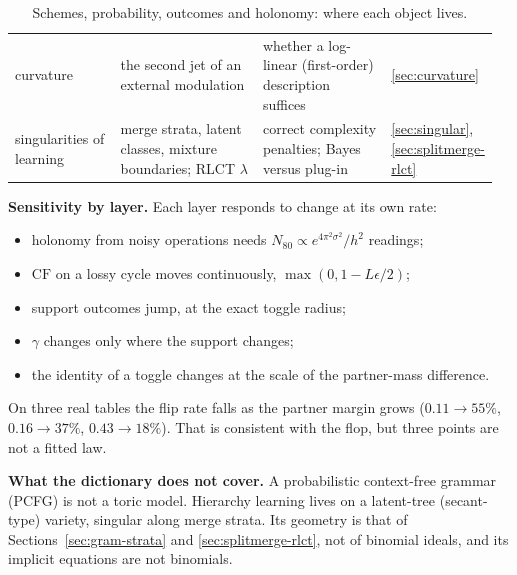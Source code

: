 \documentclass[11pt]{article}
\theoremstyle{definition}
\theoremstyle{remark}
\newcommand{\CF}{\mathrm{CF}}
\begin{document}
\begin{table}[!htbp]
{\begin{tabular}{>{\raggedright\arraybackslash}p{0.22\linewidth}>{\raggedright\arraybackslash}p{0.3\linewidth}>{\raggedright\arraybackslash}p{0.27\linewidth}>{\raggedright\arraybackslash}p{0.17\linewidth}}
curvature & the second jet of an external modulation & whether a log-linear (first-order) description suffices & \ref{sec:curvature}\\
singularities of learning & merge strata, latent classes, mixture boundaries; RLCT $\lambda$ & correct complexity penalties; Bayes versus plug-in & \ref{sec:singular}, \ref{sec:splitmerge-rlct}\\
\bottomrule
\end{tabular}}
\caption{Schemes, probability, outcomes and holonomy: where each object lives.}\label{tab:dict}
\end{table}

\textbf{Sensitivity by layer.} Each layer responds to change at its own rate:
\begin{itemize}
  \item holonomy from noisy operations needs $N_{80}\propto e^{4\pi^2\sigma^2}/h^2$ readings;
  \item $\CF$ on a lossy cycle moves continuously, $\max(0,1-L\epsilon/2)$;
  \item support outcomes jump, at the exact toggle radius;
  \item $\gamma$ changes only where the support changes;
  \item the identity of a toggle changes at the scale of the partner-mass difference.
\end{itemize}
On three real tables the flip rate falls as the partner margin grows ($0.11\to55\%$, $0.16\to37\%$, $0.43\to18\%$). That is consistent with the flop, but three points are not a fitted law.

\textbf{What the dictionary does not cover.} A probabilistic context-free grammar (PCFG) is not a toric model. Hierarchy learning lives on a latent-tree (secant-type) variety, singular along merge strata. Its geometry is that of Sections~\ref{sec:gram-strata} and \ref{sec:splitmerge-rlct}, not of binomial ideals, and its implicit equations are not binomials.
\end{document}
